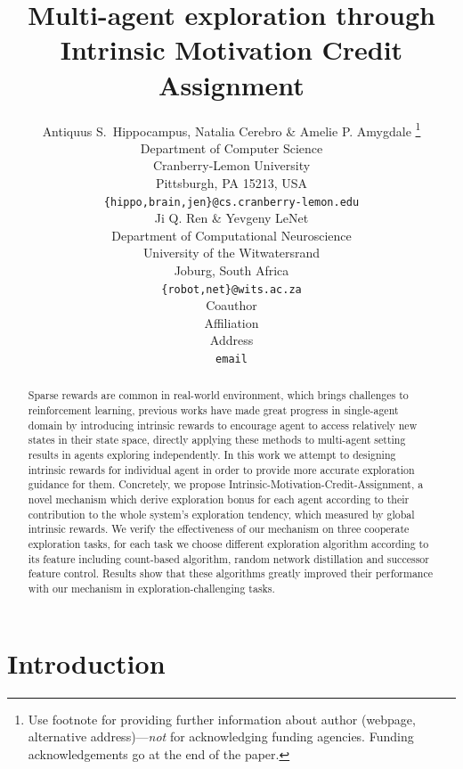 \documentclass{article} %
\title{Multi-agent exploration through Intrinsic Motivation Credit Assignment}
\author{Antiquus S.~Hippocampus, Natalia Cerebro \& Amelie P. Amygdale \thanks{ Use footnote for providing further information
about author (webpage, alternative address)---\emph{not} for acknowledging
funding agencies.  Funding acknowledgements go at the end of the paper.} \\
Department of Computer Science\\
Cranberry-Lemon University\\
Pittsburgh, PA 15213, USA \\
\texttt{\{hippo,brain,jen\}@cs.cranberry-lemon.edu} \\
\And
Ji Q. Ren \& Yevgeny LeNet \\
Department of Computational Neuroscience \\
University of the Witwatersrand \\
Joburg, South Africa \\
\texttt{\{robot,net\}@wits.ac.za} \\
\AND
Coauthor \\
Affiliation \\
Address \\
\texttt{email}
}
\begin{document}
\maketitle

\begin{abstract}
Sparse rewards are common in real-world environment, which brings challenges to reinforcement learning, previous works have made great progress in single-agent domain by introducing intrinsic rewards to encourage agent to access relatively new states in their state space, directly applying these methods to multi-agent setting results in agents exploring independently. In this work we attempt to designing intrinsic rewards for individual agent in order to provide more accurate exploration guidance for them. Concretely, we propose Intrinsic-Motivation-Credit-Assignment, a novel mechanism which derive exploration bonus for each agent according to their contribution to the whole system's exploration tendency, which measured by global intrinsic rewards. We verify the effectiveness of our mechanism on three cooperate exploration tasks, for each task we choose different exploration algorithm according to its feature including count-based algorithm, random network distillation and successor feature control. Results show that these algorithms greatly improved their performance with our mechanism in exploration-challenging tasks.  
\end{abstract}

\section{Introduction}
\end{document}
